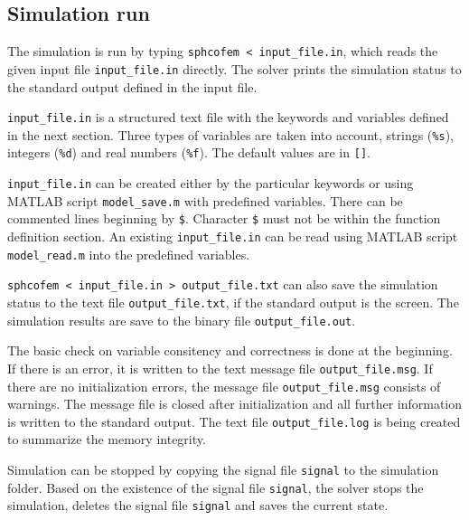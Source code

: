 \subsection{Simulation run}

The simulation is run by typing \texttt{sphcofem < input\_file.in}, which reads the given input file \texttt{input\_file.in} directly. The solver prints the simulation status to the standard output defined in the input file.

\texttt{input\_file.in} is a structured text file with the keywords and variables defined in the next section. Three types of variables are taken into account, strings (\texttt{\%s}), integers (\texttt{\%d}) and real numbers (\texttt{\%f}). The default values are in \texttt{[]}.

\texttt{input\_file.in} can be created either by the particular keywords or using MATLAB script \texttt{model\_save.m} with predefined variables. There can be commented lines beginning by \texttt{\$}. Character \texttt{\$} must not be within the function definition section. An existing \texttt{input\_file.in} can be read using MATLAB script \texttt{model\_read.m} into the predefined variables.

\texttt{sphcofem < input\_file.in > output\_file.txt} can also save the simulation status to the text file \texttt{output\_file.txt}, if the standard output is the screen. The simulation results are save to the binary file \texttt{output\_file.out}.

The basic check on variable consitency and correctness is done at the beginning. If there is an error, it is written to the text message file \texttt{output\_file.msg}. If there are no initialization errors, the message file \texttt{output\_file.msg} consists of warnings. The message file is closed after initialization and all further information is written to the standard output. The text file \texttt{output\_file.log} is being created to summarize the memory integrity.

Simulation can be stopped by copying the signal file \texttt{signal} to the simulation folder. Based on the existence of the signal file \texttt{signal}, the solver stops the simulation, deletes the signal file \texttt{signal} and saves the current state.
